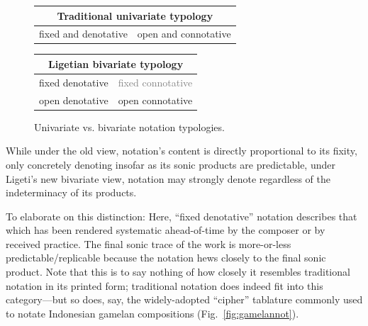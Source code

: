 \begin{figure}
    \centering
            \begin{tabular}{ |c|c| }
             \hline
             \multicolumn{2}{|c|}{\textbf{Traditional univariate typology}} \\
             \hline
             fixed and denotative & open and connotative  \\ 
             \hline
            \end{tabular}

                \vspace{10pt}

            \begin{tabular}{ |c|c| }
             \hline
             \multicolumn{2}{|c|}{\textbf{Ligetian bivariate typology}} \\
             \hline
             fixed denotative & \textcolor{gray}{fixed connotative\footnotemark}  \\ 
             \hline
             open denotative & open connotative  \\     
             \hline
            \end{tabular}
    \caption{Univariate vs. bivariate notation typologies.}
        \label{fig:typologies}
    \end{figure}

    \noindent While under the old view, notation's content is directly proportional to its fixity, only concretely denoting insofar as its sonic products are predictable, under Ligeti's new bivariate view, notation may strongly denote regardless of the indeterminacy of its products.

    To elaborate on this distinction: Here, ``fixed denotative'' notation describes that which has been rendered systematic ahead-of-time by the composer or by received practice. The final sonic trace of the work is more-or-less predictable/replicable because the notation hews closely to the final sonic product. Note that this is to say nothing of how closely it resembles traditional notation in its printed form; traditional notation does indeed fit into this category---but so does, say, the widely-adopted ``cipher'' tablature commonly used to notate Indonesian gamelan compositions (Fig.~\ref{fig:gamelannot}).

